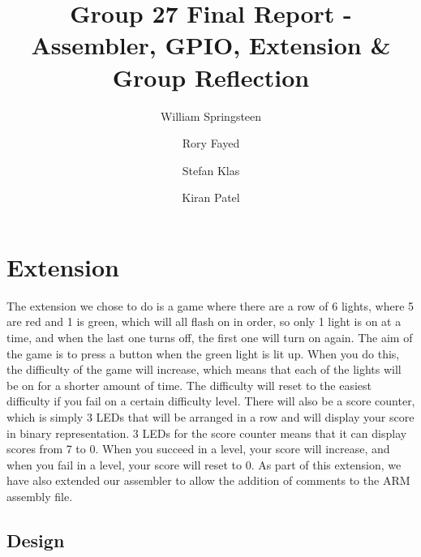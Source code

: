 \documentclass[a4wide, 10pt]{article}
\begin{document}
\title{Group 27 Final Report - Assembler, GPIO, Extension \& Group Reflection}
\author{William Springsteen \and Rory Fayed \and Stefan Klas \and Kiran Patel}

\maketitle

\section*{Extension}

The extension we chose to do is a game where there are a row of 6 lights, where 5 are red and 1 is green, which will all flash on in order, so only 1 light is on at a time, and when the last one turns off, the first one will turn on again. The aim of the game is to press a button when the green light is lit up. When you do this, the difficulty of the game will increase, which means that each of the lights will be on for a shorter amount of time. The difficulty will reset to the easiest difficulty if you fail on a certain difficulty level. There will also be a score counter, which is simply 3 LEDs that will be arranged in a row and will display your score in binary representation. 3 LEDs for the score counter means that it can display scores from 7 to 0. When you succeed in a level, your score will increase, and when you fail in a level, your score will reset to 0. As part of this extension, we have also extended our assembler to allow the addition of comments to the ARM assembly file. 

\subsection*{Design}
\end{document}
